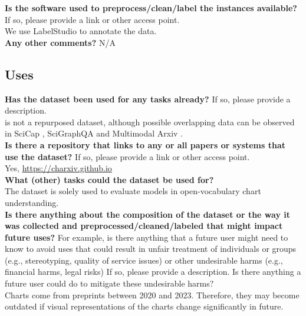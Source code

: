     \textcolor{\sectioncolor}{\textbf{Is the software used to preprocess/clean/label the instances available?
    }
    If so, please provide a link or other access point.
    } \\
    We use LabelStudio \cite{LabelStudio} to annotate the data. \\

    \textcolor{\sectioncolor}{\textbf{Any other comments?
    }} N/A \\

\subsection{Uses}

    \textcolor{\sectioncolor}{\textbf{Has the dataset been used for any tasks already?
    }
    If so, please provide a description.
    } \\
    \ours{} is not a repurposed dataset, although possible overlapping data can be observed in SciCap \cite{hsu2021scicap}, SciGraphQA \cite{li2023scigraphqa} and Multimodal Arxiv \cite{li2024multimodal}. \\

    \textcolor{\sectioncolor}{\textbf{Is there a repository that links to any or all papers or systems that use the dataset?
    }
    If so, please provide a link or other access point.
    } \\
    Yes, \url{https://charxiv.github.io} \\

    \textcolor{\sectioncolor}{\textbf{What (other) tasks could the dataset be used for?
    }
    } \\
    The dataset is solely used to evaluate models in open-vocabulary chart understanding. \\

    \textcolor{\sectioncolor}{\textbf{Is there anything about the composition of the dataset or the way it was
    collected and preprocessed/cleaned/labeled that might impact future uses?
    }
    For example, is there anything that a future user might need to know to
    avoid uses that could result in unfair treatment of individuals or groups
    (e.g., stereotyping, quality of service issues) or other undesirable harms
    (e.g., financial harms, legal risks) If so, please provide a description.
    Is there anything a future user could do to mitigate these undesirable
    harms?
    } \\
    Charts come from preprints between 2020 and 2023. Therefore, they may become outdated if visual representations of the charts change significantly in future. \\

